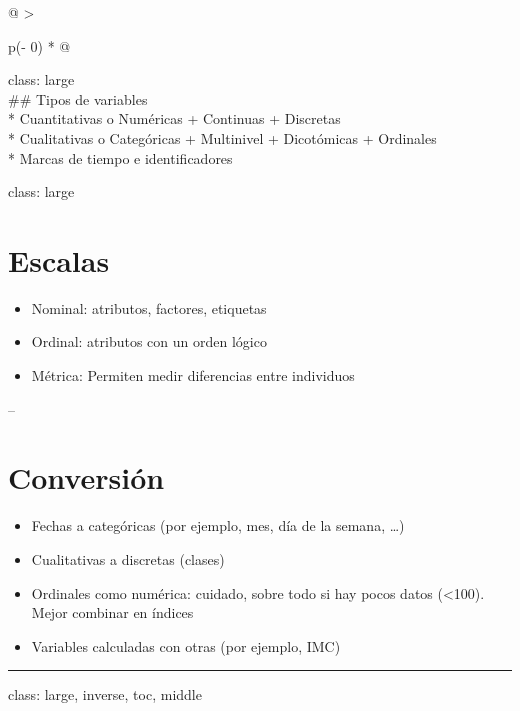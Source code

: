\documentclass[
]{book}
\providecommand{\tightlist}{%
  \setlength{\itemsep}{0pt}\setlength{\parskip}{0pt}}
\begin{document}
\begin{longtable}[]{@{}
  >{\raggedright\arraybackslash}p{(\columnwidth - 0\tabcolsep) * }@{}}
\toprule
\endhead
class: large \\
\#\# Tipos de variables \\
* Cuantitativas o Numéricas
+ Continuas
+ Discretas \\
* Cualitativas o Categóricas
+ Multinivel
+ Dicotómicas
+ Ordinales \\
* Marcas de tiempo e identificadores \\
\bottomrule
\end{longtable}

class: large

\hypertarget{escalas}{%
\section{Escalas}\label{escalas}}

\begin{itemize}
\item
  Nominal: atributos, factores, etiquetas
\item
  Ordinal: atributos con un orden lógico
\item
  Métrica: Permiten medir diferencias entre individuos
\end{itemize}

--

\hypertarget{conversiuxf3n}{%
\section{Conversión}\label{conversiuxf3n}}

\begin{itemize}
\tightlist
\item
  Fechas a categóricas (por ejemplo, mes, día de la semana, \ldots)
\item
  Cualitativas a discretas (clases)
\item
  Ordinales como numérica: cuidado, sobre todo si hay pocos datos (\textless100). Mejor
  combinar en índices
\item
  Variables calculadas con otras (por ejemplo, IMC)
\end{itemize}

\begin{center}\rule{0.5\linewidth}{0.5pt}\end{center}

class: large, inverse, toc, middle
\end{document}
